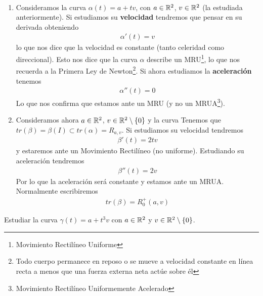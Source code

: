 \begin{ejemplo}\
    \begin{enumerate}
        \item Consideramos la curva $\alpha(t) = a + tv$, con $a\in \mathbb{R}^2$, $v\in \mathbb{R}^2$ (la estudiada anteriormente). Si estudiamos su \textbf{velocidad} tendremos que pensar en su derivada obteniendo
        \begin{gather*}
            \alpha'(t) = v
        \end{gather*}
        lo que nos dice que la velocidad es constante (tanto celeridad como direccional). Esto nos dice que la curva $\alpha$ describe un MRU\footnote{Movimiento Rectilíneo Uniforme}, lo que nos recuerda a la Primera Ley de Newton\footnote{Todo cuerpo permanece en reposo o se mueve a velocidad constante en línea recta a menos que una fuerza externa neta actúe sobre él}. Si ahora estudiamos la \textbf{aceleración} tenemos 
        \begin{gather*}
            \alpha''(t) = 0
        \end{gather*}
        Lo que nos confirma que estamos ante un MRU (y no un MRUA\footnote{Movimiento Rectilíneo Uniformemente Acelerado}).

        \item Consideramos ahora $a\in \mathbb{R}^2$, $v\in \mathbb{R}^2\setminus\{0\}$ y la curva
        \Func{\beta}{\bb{R}}{\bb{R}^2}{t}{a+t^2v}
        Tenemos que $tr(\beta) = \beta(I)\subset tr(\alpha)=R_{a,v}$. Si estudiamos su velocidad tendremos 
        \begin{gather*}
            \beta'(t)=2tv
        \end{gather*}
        y estaremos ante un Movimiento Rectilíneo (no uniforme). Estudiando su aceleración tendremos
        \begin{gather*}
            \beta''(t) = 2v
        \end{gather*}
        Por lo que la aceleración será constante y estamos ante un MRUA. Normalmente escribiremos
        \begin{gather*}
            tr(\beta) = R_0^+(a,v)
        \end{gather*}

    \end{enumerate}
\end{ejemplo}

\begin{ejercicio}
    Estudiar la curva $\gamma(t) = a + t^3v$ con $a\in \mathbb{R}^2$ y $v\in \mathbb{R}^2\setminus \{0\}$.
\end{ejercicio}

